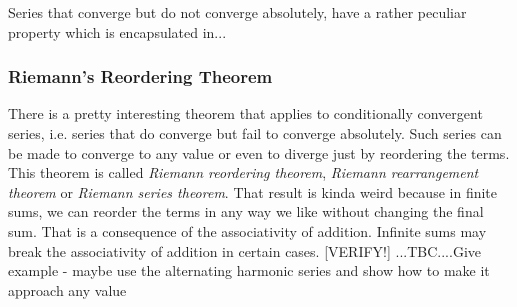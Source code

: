 Series that converge but do not converge absolutely, have a rather peculiar property which is encapsulated in...






\subsubsection{Riemann's Reordering Theorem} There is a pretty interesting theorem that applies to conditionally convergent series, i.e. series that do converge but fail to converge absolutely. Such series can be made to converge to any value or even to diverge just by reordering the terms. This theorem is called \emph{Riemann reordering theorem}, \emph{Riemann rearrangement theorem} or \emph{Riemann series theorem}. That result is kinda weird because in finite sums, we can reorder the terms in any way we like without changing the final sum. That is a consequence of the associativity of addition. Infinite sums may break the associativity of addition in certain cases. [VERIFY!] ...TBC....Give example - maybe use the alternating harmonic series and show how to make it approach any value




